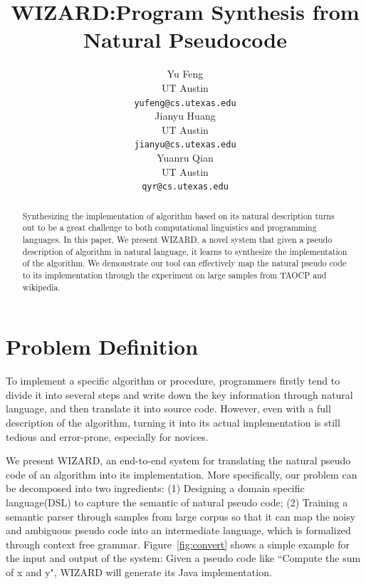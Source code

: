 \documentclass[11pt]{article}
\title{WIZARD:Program Synthesis from Natural Pseudocode}
\author{Yu Feng \\
  UT Austin \\
  {\tt yufeng@cs.utexas.edu} \\\And
  Jianyu Huang \\
  UT Austin \\
  {\tt jianyu@cs.utexas.edu}  \\\And
    Yuanru Qian \\
  UT Austin \\
  {\tt qyr@cs.utexas.edu} \\}
\date{}
\begin{document}
\maketitle
\begin{abstract}
  Synthesizing the implementation of algorithm based on its 
  natural description turns out to be a great challenge to both 
  computational linguistics and programming languages. In this paper,
  We present WIZARD, a novel system that given a pseudo description 
  of algorithm in natural language, it learns to synthesize the 
  implementation of the algorithm.  We demonstrate our tool can effectively
  map the natural pseudo code to its implementation through the
  experiment on large samples from TAOCP and wikipedia.
\end{abstract}

\section{Problem Definition}
To implement a specific algorithm or procedure, programmers firstly tend to 
divide it into several steps and write down the key information through
natural language, and then translate it into source code. However, even 
with a full description of the algorithm, turning it into its actual 
implementation is still tedious and error-prone, especially for novices.

We present WIZARD, an end-to-end system for translating the natural pseudo code
of an algorithm into its implementation. More specifically,
our problem can be decomposed into two ingredients: (1) Designing a domain 
specific language(DSL) to capture the semantic of natural pseudo code; 
(2) Training a semantic parser through samples from large corpus so that it can
 map the noisy and ambiguous pseudo code into an intermediate language, which is 
 formalized through context free grammar. Figure~\ref{fig:convert} shows a 
 simple example for the input and output of the system: Given a pseudo code like 
 ``Compute the sum of x and y", WIZARD will generate its Java implementation.
\end{document}
